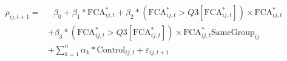 \begin{equation}
\begin{split}
\rho_{ij,t+1} = & \text{ 	}\beta_0 + \beta_1* \text{FCA}^*_{ij,t}  + \beta_2* (\text{FCA}^*_{ij,t} > Q3[\text{FCA}^*_{ij,t}]) \times {\text{FCA} ^*_{ij,t}} \\
& +  \beta_3* (\text{FCA}^*_{ij,t} > Q3[\text{FCA}^*_{ij,t}]) \times {\text{FCA} ^*_{ij,t}} \text{SameGroup}_{ij}  \\
  & + \sum_{k=1} ^{n} \alpha_k*\text{Control}_{ij,t} + \varepsilon_{ij,t+1}
\end{split}
\label{model2}
\end{equation}
